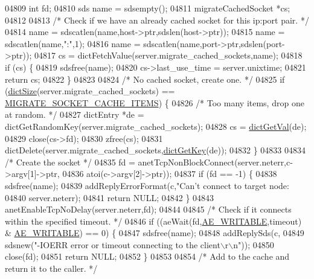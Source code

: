 \begin{DoxyCode}
{{{{{{{{{{{{{{{{{{{{{{{{{{{{{{{{{{{{{{{{{{{{{{{{{{{{{{{{{{{{{{{{{{{{{{{{{{{{{{{{{{{{{{{{{{{{{{{{{{{{{{{{{{04809     \textcolor{keywordtype}{int} fd;
04810     sds name = sdsempty();
04811     migrateCachedSocket *cs;
04812 
04813     \textcolor{comment}{/* Check if we have an already cached socket for this ip:port pair. */}
04814     name = sdscatlen(name,host->ptr,sdslen(host->ptr));
04815     name = sdscatlen(name,\textcolor{stringliteral}{":"},1);
04816     name = sdscatlen(name,port->ptr,sdslen(port->ptr));
04817     cs = dictFetchValue(server.migrate\_cached\_sockets,name);
04818     \textcolor{keywordflow}{if} (cs) \{
04819         sdsfree(name);
04820         cs->last\_use\_time = server.unixtime;
04821         \textcolor{keywordflow}{return} cs;
04822     \}
04823 
04824     \textcolor{comment}{/* No cached socket, create one. */}
04825     \textcolor{keywordflow}{if} (\hyperlink{dict_8h_af193430dd3d5579a52b194512f72c1f0}{dictSize}(server.migrate\_cached\_sockets) == 
      \hyperlink{cluster_8c_ac30325257580f172bb7885ac10c482f7}{MIGRATE\_SOCKET\_CACHE\_ITEMS}) \{
04826         \textcolor{comment}{/* Too many items, drop one at random. */}
04827         dictEntry *de = dictGetRandomKey(server.migrate\_cached\_sockets);
04828         cs = \hyperlink{dict_8h_ae8d2cc391873b2bea2b87c4f80f43120}{dictGetVal}(de);
04829         close(cs->fd);
04830         zfree(cs);
04831         dictDelete(server.migrate\_cached\_sockets,\hyperlink{dict_8h_a3271c334309904a3086deca94f96e46e}{dictGetKey}(de));
04832     \}
04833 
04834     \textcolor{comment}{/* Create the socket */}
04835     fd = anetTcpNonBlockConnect(server.neterr,c->argv[1]->ptr,
04836                                 atoi(c->argv[2]->ptr));
04837     \textcolor{keywordflow}{if} (fd == -1) \{
04838         sdsfree(name);
04839         addReplyErrorFormat(c,\textcolor{stringliteral}{"Can't connect to target node: %
04840             server.neterr);
04841         \textcolor{keywordflow}{return} NULL;
04842     \}
04843     anetEnableTcpNoDelay(server.neterr,fd);
04844 
04845     \textcolor{comment}{/* Check if it connects within the specified timeout. */}
04846     \textcolor{keywordflow}{if} ((aeWait(fd,\hyperlink{ae_8h_ab6bfb0366ccb6277112d132c2a2bf500}{AE\_WRITABLE},timeout) & \hyperlink{ae_8h_ab6bfb0366ccb6277112d132c2a2bf500}{AE\_WRITABLE}) == 0) \{
04847         sdsfree(name);
04848         addReplySds(c,
04849             sdsnew(\textcolor{stringliteral}{"-IOERR error or timeout connecting to the client\(\backslash\)r\(\backslash\)n"}));
04850         close(fd);
04851         \textcolor{keywordflow}{return} NULL;
04852     \}
04853 
04854     \textcolor{comment}{/* Add to the cache and return it to the caller. */}
}}}}}}}}}}}}}}}}}}}}}}}}}}}}}}}}}}}}}}}}}}}}}}}}}}}}}}}}}}}}}}}}}}}}}}}}}}}}}}}}}}}}}}}}}}}}}}}}}}}}}}}}}}}
\end{DoxyCode}
